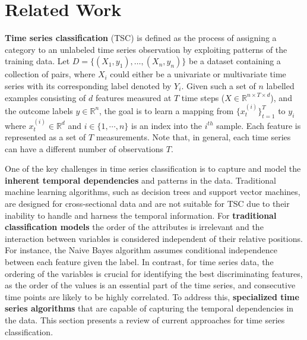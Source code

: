 \section{Related Work}\label{sec:related_work_4}

\textbf{Time series classification} (TSC) is defined as the process of assigning a category to an unlabeled time series observation by exploiting patterns of the training data.
Let 
$D=\{(X_{1}, y_{1}), \ldots, (X_{n}, y_{n})\}$ 
be a dataset containing a collection of pairs, where $X_{i}$ could either be a univariate or multivariate time series with its corresponding label denoted by $Y_{i}$.
Given such a set of $n$ labelled examples consisting of $d$ features measured at $T$ time steps ($X \in \mathbb{R}^{n \times T \times d}$), and the outcome labels $y \in \mathbb{R}^{n}$, the goal is to learn a mapping from $\{x_{t}^{(i)}\}_{t=1}^{T}$ to $y_{i}$ where $x_{t}^{(i)} \in \mathbb{R}^{d}$ and $i \in \{1,\cdots,n\}$ is an index into the $i^{th}$ sample. Each feature is represented as a set of $T$ measurements. 
Note that, in general, each time series can have a different number of observations $T$.


One of the key challenges in time series classification is to capture and model the \textbf{inherent temporal dependencies} and patterns in the data. Traditional machine learning algorithms, such as decision trees and support vector machines, are designed for cross-sectional data and are not suitable for TSC due to their inability to handle and harness the temporal information. 
For \textbf{traditional classification models} the order of the attributes is irrelevant and the interaction between variables is considered independent of their relative positions. 
For instance, the Naive Bayes algorithm assumes conditional independence between each feature given the label.
In contrast, for time series data, the ordering of the variables is crucial for identifying the best discriminating features, as the order of the values is an essential part of the time series, and consecutive time points are likely to be highly correlated. 
To address this, \textbf{specialized time series algorithms} that are capable of capturing the temporal dependencies in the data. This section presents a review of current approaches for time series classification.

